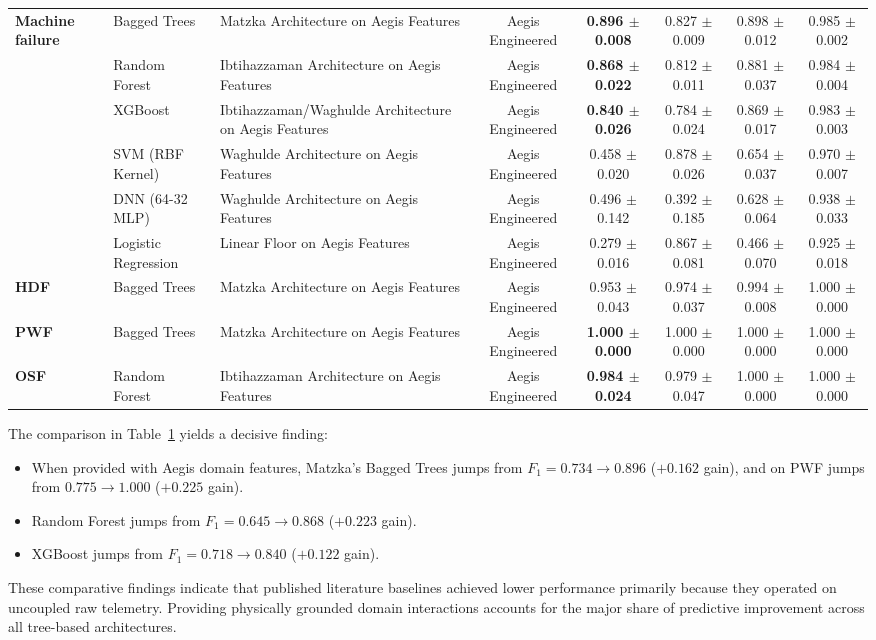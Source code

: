 \documentclass[conference]{IEEEtran}
\begin{document}
\begin{itemize}
\begin{table}[t]
\begin{tabular}{lllccccc}
\midrule
\multirow{6}{*}{\textbf{Machine failure}} & Bagged Trees & Matzka Architecture on Aegis Features & Aegis Engineered & \textbf{0.896 $\pm$ 0.008} & 0.827 $\pm$ 0.009 & 0.898 $\pm$ 0.012 & 0.985 $\pm$ 0.002 \\
 & Random Forest & Ibtihazzaman Architecture on Aegis Features & Aegis Engineered & \textbf{0.868 $\pm$ 0.022} & 0.812 $\pm$ 0.011 & 0.881 $\pm$ 0.037 & 0.984 $\pm$ 0.004 \\
 & XGBoost & Ibtihazzaman/Waghulde Architecture on Aegis Features & Aegis Engineered & \textbf{0.840 $\pm$ 0.026} & 0.784 $\pm$ 0.024 & 0.869 $\pm$ 0.017 & 0.983 $\pm$ 0.003 \\
 & SVM (RBF Kernel) & Waghulde Architecture on Aegis Features & Aegis Engineered & 0.458 $\pm$ 0.020 & 0.878 $\pm$ 0.026 & 0.654 $\pm$ 0.037 & 0.970 $\pm$ 0.007 \\
 & DNN (64-32 MLP) & Waghulde Architecture on Aegis Features & Aegis Engineered & 0.496 $\pm$ 0.142 & 0.392 $\pm$ 0.185 & 0.628 $\pm$ 0.064 & 0.938 $\pm$ 0.033 \\
 & Logistic Regression & Linear Floor on Aegis Features & Aegis Engineered & 0.279 $\pm$ 0.016 & 0.867 $\pm$ 0.081 & 0.466 $\pm$ 0.070 & 0.925 $\pm$ 0.018 \\
\midrule
\textbf{HDF} & Bagged Trees & Matzka Architecture on Aegis Features & Aegis Engineered & 0.953 $\pm$ 0.043 & 0.974 $\pm$ 0.037 & 0.994 $\pm$ 0.008 & 1.000 $\pm$ 0.000 \\
\textbf{PWF} & Bagged Trees & Matzka Architecture on Aegis Features & Aegis Engineered & \textbf{1.000 $\pm$ 0.000} & 1.000 $\pm$ 0.000 & 1.000 $\pm$ 0.000 & 1.000 $\pm$ 0.000 \\
\textbf{OSF} & Random Forest & Ibtihazzaman Architecture on Aegis Features & Aegis Engineered & \textbf{0.984 $\pm$ 0.024} & 0.979 $\pm$ 0.047 & 1.000 $\pm$ 0.000 & 1.000 $\pm$ 0.000 \\
\bottomrule
\end{tabular}
\label{tab:baseline_fairness}
\end{table}

The comparison in Table~\ref{tab:baseline_fairness} yields a decisive finding:
\begin{itemize}
    \item When provided with Aegis domain features, Matzka's Bagged Trees jumps from $F_1 = 0.734 \rightarrow \mathbf{0.896}$ ($+0.162$ gain), and on PWF jumps from $0.775 \rightarrow \mathbf{1.000}$ ($+0.225$ gain).
    \item Random Forest jumps from $F_1 = 0.645 \rightarrow \mathbf{0.868}$ ($+0.223$ gain).
    \item XGBoost jumps from $F_1 = 0.718 \rightarrow \mathbf{0.840}$ ($+0.122$ gain).
\end{itemize}
These comparative findings indicate that published literature baselines achieved lower performance primarily because they operated on uncoupled raw telemetry. Providing physically grounded domain interactions accounts for the major share of predictive improvement across all tree-based architectures.


\end{itemize}
\end{document}

